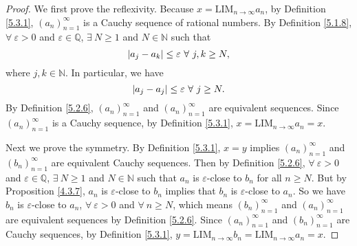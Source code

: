 \begin{proof}
We first prove the reflexivity.
Because \(x = \text{LIM}_{n \to \infty} a_n\), by Definition \ref{5.3.1}, \((a_n)_{n = 1}^{\infty}\) is a Cauchy sequence of rational numbers.
By Definition \ref{5.1.8}, \(\forall\ \varepsilon > 0\) and \(\varepsilon \in \mathds{Q}\), \(\exists\ N \geq 1\) and \(N \in \mathds{N}\) such that
\[
    \abs*{a_j - a_k} \leq \varepsilon \ \forall\ j, k \geq N,
\]
where \(j, k \in \mathds{N}\).
In particular, we have
\[
    \abs*{a_j - a_j} \leq \varepsilon \ \forall\ j \geq N.
\]
By Definition \ref{5.2.6}, \((a_n)_{n = 1}^{\infty}\) and \((a_n)_{n = 1}^{\infty}\) are equivalent sequences.
Since \((a_n)_{n = 1}^{\infty}\) is a Cauchy sequence, by Definition \ref{5.3.1}, \(x = \text{LIM}_{n \to \infty} a_n = x\).

Next we prove the symmetry.
By Definition \ref{5.3.1}, \(x = y\) implies \((a_n)_{n = 1}^{\infty}\) and \((b_n)_{n = 1}^{\infty}\) are equivalent Cauchy sequences.
Then by Definition \ref{5.2.6}, \(\forall\ \varepsilon > 0\) and \(\varepsilon \in \mathds{Q}\), \(\exists\ N \geq 1\) and \(N \in \mathds{N}\) such that \(a_n\) is \(\varepsilon\)-close to \(b_n\) for all \(n \geq N\).
But by Proposition \ref{4.3.7}, \(a_n\) is \(\varepsilon\)-close to \(b_n\) implies that \(b_n\) is \(\varepsilon\)-close to \(a_n\).
So we have \(b_n\) is \(\varepsilon\)-close to \(a_n\), \(\forall\ \varepsilon > 0\) and \(\forall\ n \geq N\), which means \((b_n)_{n = 1}^{\infty}\) and \((a_n)_{n = 1}^{\infty}\) are equivalent sequences by Definition \ref{5.2.6}.
Since \((a_n)_{n = 1}^{\infty}\) and \((b_n)_{n = 1}^{\infty}\) are Cauchy sequences, by Definition \ref{5.3.1}, \(y = \text{LIM}_{n \to \infty} b_n = \text{LIM}_{n \to \infty} a_n = x\).


\end{proof}
